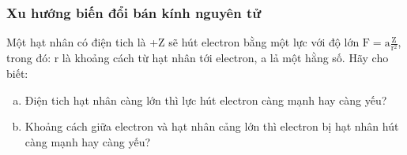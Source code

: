 \subsubsection{Xu hướng biến đổi bán kính nguyên tử}
\vspace{0.25cm}
\begin{hoivadap}
	Một hạt nhân có điện tich là +Z sẽ hút electron bằng một lực với độ lớn $\mathrm{F}=\mathrm{a} \tfrac{\mathrm{Z}}{\mathrm{r}^2}$, trong đó: r là khoảng cách từ hạt nhân tới electron, a lả một hằng số. Hãy cho biết:
	\begin{enumerate}[a)]
		\item  Điện tich hạt nhân càng lớn thì lực hút electron càng mạnh hay càng yếu?
		\item  Khoảng cách giữa electron và hạt nhân cảng lớn thì electron bị hạt nhân hút càng mạnh hay càng yếu?
	\end{enumerate}
\end{hoivadap}
\vspace{0.25cm}
